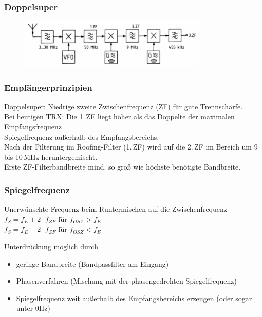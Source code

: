 \begin{frame}
  \frametitle{Doppelsuper}
  \begin{center}
    \begin{figure}
      \includegraphics[width=0.8\textwidth,height=.5\textheight,keepaspectratio]{a13/TF209b.png}
    \end{figure}
  \end{center}
\end{frame}
\begin{frame}
  \frametitle{Empfängerprinzipien}

  Doppelsuper: Niedrige zweite Zwischenfrequenz (ZF) für gute Trennschärfe. \\[2em]

  Bei heutigen TRX: Die 1.\,ZF liegt höher als das Doppelte der maximalen
  Empfangsfrequenz \\

Spiegelfrequenz außerhalb des Empfangsbereichs.\\[2em]

 Nach der Filterung im Roofing-Filter (1.\,ZF) wird auf die
  2.\,ZF im Bereich um 9 bis 10\,MHz heruntergemischt. \\[2em]

  Erste ZF-Filterbandbreite mind. so groß wie höchste benötigte Bandbreite.
\end{frame}

\begin{frame}
  \frametitle{Spiegelfrequenz}
  \begin{block}{Unerwünschte Frequenz beim Runtermischen auf die Zwischenfrequenz}
    $f_S = f_E + 2 \cdot f_{ZF} \text{ für } f_{OSZ} > f_E$ \\
    $f_S = f_E - 2 \cdot f_{ZF} \text{ für } f_{OSZ} < f_E$
  \end{block}
  Unterdrückung möglich durch
  \begin{itemize}
    \item geringe Bandbreite (Bandpassfilter am Eingang)
    \item Phasenverfahren (Mischung mit der phasengedrehten Spiegelfrequenz)
    \item Spiegelfrequenz weit außerhalb des Empfangsbereichs erzeugen (oder sogar unter 0Hz)
  \end{itemize}
\end{frame}

